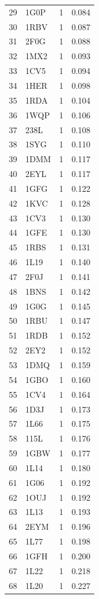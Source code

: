 \begin{longtable}{r l r r}
29 & 1G0P & 1 & 0.084 \\
30 & 1RBV & 1 & 0.087 \\
31 & 2F0G & 1 & 0.088 \\
32 & 1MX2 & 1 & 0.093 \\
33 & 1CV5 & 1 & 0.094 \\
34 & 1HER & 1 & 0.098 \\
35 & 1RDA & 1 & 0.104 \\
36 & 1WQP & 1 & 0.106 \\
37 & 238L & 1 & 0.108 \\
38 & 1SYG & 1 & 0.110 \\
39 & 1DMM & 1 & 0.117 \\
40 & 2EYL & 1 & 0.117 \\
41 & 1GFG & 1 & 0.122 \\
42 & 1KVC & 1 & 0.128 \\
43 & 1CV3 & 1 & 0.130 \\
44 & 1GFE & 1 & 0.130 \\
45 & 1RBS & 1 & 0.131 \\
46 & 1L19 & 1 & 0.140 \\
47 & 2F0J & 1 & 0.141 \\
48 & 1BNS & 1 & 0.142 \\
49 & 1G0G & 1 & 0.145 \\
50 & 1RBU & 1 & 0.147 \\
51 & 1RDB & 1 & 0.152 \\
52 & 2EY2 & 1 & 0.152 \\
53 & 1DMQ & 1 & 0.159 \\
54 & 1GBO & 1 & 0.160 \\
55 & 1CV4 & 1 & 0.164 \\
56 & 1D3J & 1 & 0.173 \\
57 & 1L66 & 1 & 0.175 \\
58 & 115L & 1 & 0.176 \\
59 & 1GBW & 1 & 0.177 \\
60 & 1L14 & 1 & 0.180 \\
61 & 1G06 & 1 & 0.192 \\
62 & 1OUJ & 1 & 0.192 \\
63 & 1L13 & 1 & 0.193 \\
64 & 2EYM & 1 & 0.196 \\
65 & 1L77 & 1 & 0.198 \\
66 & 1GFH & 1 & 0.200 \\
67 & 1L22 & 1 & 0.218 \\
68 & 1L20 & 1 & 0.227 \\

\end{longtable}
